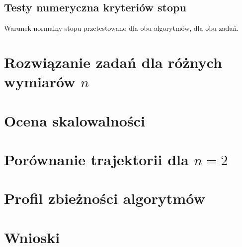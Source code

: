 \documentclass[11pt, a4paper, oneside]{article}
\begin{document}
\subsection*{Testy numeryczna kryteriów stopu}

Warunek normalny stopu przetestowano dla obu algorytmów, dla obu zadań.

\section{Rozwiązanie zadań dla różnych wymiarów $n$}

\section{Ocena skalowalności}

\section{Porównanie trajektorii dla $n = 2$}

\section{Profil zbieżności algorytmów}

\section{Wnioski} 

\begin{figure}[h]
	\begin{floatrow}
	\end{floatrow}
\end{figure}

{}

\end{document}
